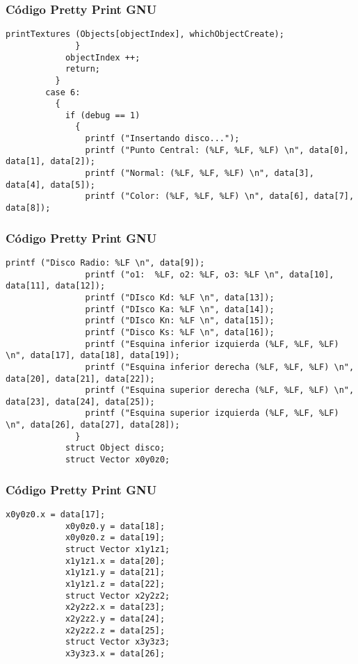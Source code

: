 \documentclass{beamer}
\begin{document}
\begin{frame}[fragile]
\frametitle{C\'odigo Pretty Print GNU}
\begin{lstlisting}[style=CStyle]
                printTextures (Objects[objectIndex], whichObjectCreate);
              }
            objectIndex ++;
            return;
          }
        case 6:
          {
            if (debug == 1)
              {
                printf ("Insertando disco...");
                printf ("Punto Central: (%LF, %LF, %LF) \n", data[0], data[1], data[2]);
                printf ("Normal: (%LF, %LF, %LF) \n", data[3], data[4], data[5]);
                printf ("Color: (%LF, %LF, %LF) \n", data[6], data[7], data[8]);
\end{lstlisting}
\end{frame}
\begin{frame}[fragile]
\frametitle{C\'odigo Pretty Print GNU}
\begin{lstlisting}[style=CStyle]
                printf ("Disco Radio: %LF \n", data[9]);
                printf ("o1:  %LF, o2: %LF, o3: %LF \n", data[10], data[11], data[12]);
                printf ("DIsco Kd: %LF \n", data[13]);
                printf ("DIsco Ka: %LF \n", data[14]);
                printf ("DIsco Kn: %LF \n", data[15]);
                printf ("Disco Ks: %LF \n", data[16]);
                printf ("Esquina inferior izquierda (%LF, %LF, %LF) \n", data[17], data[18], data[19]);
                printf ("Esquina inferior derecha (%LF, %LF, %LF) \n", data[20], data[21], data[22]);
                printf ("Esquina superior derecha (%LF, %LF, %LF) \n", data[23], data[24], data[25]);
                printf ("Esquina superior izquierda (%LF, %LF, %LF) \n", data[26], data[27], data[28]);
              }
            struct Object disco;
            struct Vector x0y0z0;
\end{lstlisting}
\end{frame}
\begin{frame}[fragile]
\frametitle{C\'odigo Pretty Print GNU}
\begin{lstlisting}[style=CStyle]
            x0y0z0.x = data[17];
            x0y0z0.y = data[18];
            x0y0z0.z = data[19];
            struct Vector x1y1z1;
            x1y1z1.x = data[20];
            x1y1z1.y = data[21];
            x1y1z1.z = data[22];
            struct Vector x2y2z2;
            x2y2z2.x = data[23];
            x2y2z2.y = data[24];
            x2y2z2.z = data[25];
            struct Vector x3y3z3;
            x3y3z3.x = data[26];
\end{lstlisting}
\end{frame}
\end{document}
